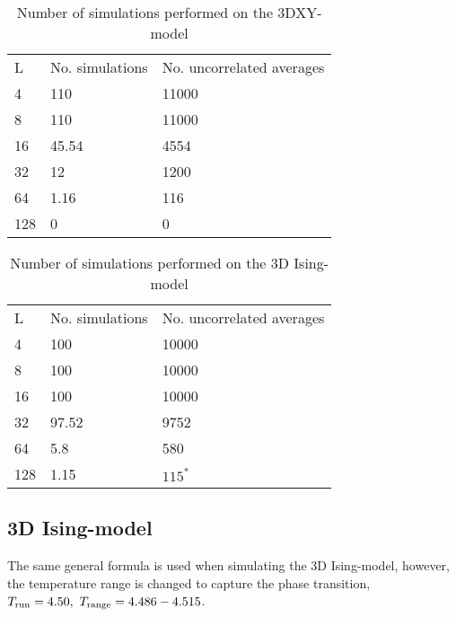 \begin{table}[htpb]
\begin{center}
\begin{tabular}{l l l}
  L & No. simulations & No. uncorrelated averages\\
  4 & 110 & 11000\\
  8 & 110 & 11000\\
  16 & 45.54 & 4554\\
  32 & 12 & 1200\\
  64 & 1.16 & 116 \\
  128 & 0  & 0 \\
\end{tabular}
\end{center}
\caption{Number of simulations performed on the 3DXY-model}
\end{table}

\begin{table}[htpb]
\begin{center}
\begin{tabular}{l l l}
  L & No. simulations & No. uncorrelated averages\\
  4 & 100 & 10000\\
  8 & 100 & 10000\\
  16 & 100 & 10000\\
  32 & 97.52 & 9752 \\
  64 & 5.8 & 580 \\
  128 & 1.15  & $115^{*}$ \\
\end{tabular}
\end{center}
\caption{Number of simulations performed on the 3D Ising-model}
\end{table}
\subsection{3D Ising-model}
The same general formula is used when simulating the 3D Ising-model, however, the temperature range is changed to capture the phase transition, $T_{\textrm{run}} = 4.50, ~ T_{\textrm{range}} = 4.486-4.515$.



%



